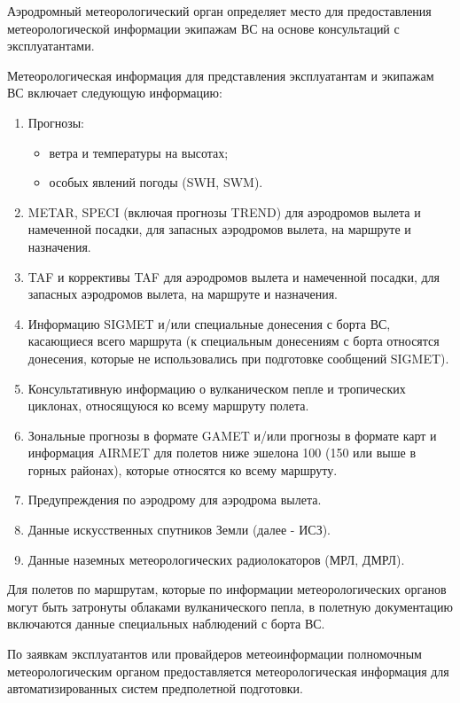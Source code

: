 Аэродромный метеорологический орган определяет место для предоставления метеорологической информации экипажам ВС на основе консультаций с эксплуатантами.

Метеорологическая информация для представления эксплуатантам и экипажам ВС включает следующую информацию: 
\begin{enumerate}
    \item Прогнозы:
    \begin{itemize}
        \item ветра и температуры на высотах;
        \item особых явлений погоды (SWH, SWM).
    \end{itemize}
    \item METAR, SPECI (включая прогнозы TREND) для аэродромов вылета и намеченной посадки, для запасных аэродромов вылета, на маршруте и назначения.
    \item TAF и коррективы TAF для аэродромов вылета и намеченной посадки, для запасных аэродромов вылета, на маршруте и назначения. 
    \item Информацию SIGMET и/или специальные донесения с борта ВС, касающиеся всего маршрута (к специальным донесениям с борта относятся донесения, которые не использовались при подготовке сообщений SIGMET).
    \item Консультативную информацию о вулканическом пепле и тропических циклонах, относящуюся ко всему маршруту полета.
    \item Зональные прогнозы в формате GAMET и/или прогнозы в формате карт и информация AIRMET для полетов ниже эшелона 100 (150 или выше в горных районах), которые относятся ко всему маршруту. 
    \item Предупреждения по аэродрому для аэродрома вылета. 
    \item Данные искусственных спутников Земли (далее - ИСЗ).
    \item Данные наземных метеорологических радиолокаторов (МРЛ, ДМРЛ).
\end{enumerate}

Для полетов по маршрутам, которые по информации метеорологических органов могут быть затронуты облаками вулканического пепла, в полетную документацию включаются данные специальных наблюдений с борта ВС.

По заявкам эксплуатантов или провайдеров метеоинформации полномочным метеорологическим органом предоставляется метеорологическая информация для автоматизированных систем предполетной подготовки.

